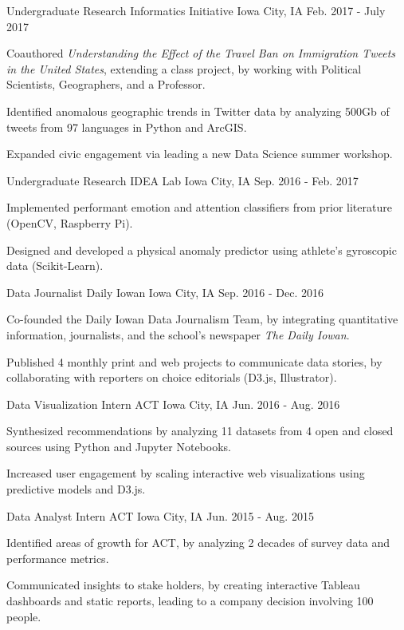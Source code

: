 \begin{cventries}
\cventry
  {Undergraduate Research}
  {Informatics Initiative}
  {Iowa City, IA}
  {Feb. 2017 - July 2017}
  {
    \begin{cvitems}
      \item {Coauthored \textit{Understanding the Effect of the Travel Ban on Immigration Tweets in the United States}, extending a class project, by working with Political Scientists, Geographers, and a Professor.}
      \item {Identified anomalous geographic trends in Twitter data by analyzing 500Gb of tweets from 97 languages in Python and ArcGIS.}
      \item {Expanded civic engagement via leading a new Data Science summer workshop.}
    \end{cvitems}
  }
  \cventry
    {Undergraduate Research}
    {IDEA Lab}
    {Iowa City, IA}
    {Sep. 2016 - Feb. 2017}
    {
      \begin{cvitems}
        \item{Implemented performant emotion and attention classifiers from prior literature (OpenCV, Raspberry Pi).}
        \item {Designed and developed a physical anomaly predictor using athlete's gyroscopic data (Scikit-Learn). }
      \end{cvitems}
    }
  \cventry
    {Data Journalist}
    {Daily Iowan}
    {Iowa City, IA}
    {Sep. 2016 - Dec. 2016}
    {
      \begin{cvitems}
        \item {Co-founded the Daily Iowan Data Journalism Team, by integrating quantitative information, journalists, and the school's newspaper \textit{The Daily Iowan}.}
        \item {Published 4 monthly print and web projects to communicate data stories, by collaborating with reporters on choice editorials (D3.js, Illustrator).}
      \end{cvitems}
    }
  \cventry
    {Data Visualization Intern}
    {ACT}
    {Iowa City, IA}
    {Jun. 2016 - Aug. 2016}
    {
      \begin{cvitems}
        \item {Synthesized recommendations by analyzing 11 datasets from 4 open and closed sources using Python and Jupyter Notebooks. }
        \item {Increased user engagement by scaling interactive web visualizations using predictive models and D3.js.}
      \end{cvitems}
    }
  \cventry
    {Data Analyst Intern}
    {ACT}
    {Iowa City, IA}
    {Jun. 2015 - Aug. 2015}
    {
      \begin{cvitems}
        \item {Identified areas of growth for ACT, by analyzing 2 decades of survey data and performance metrics.}
        \item {Communicated insights to stake holders, by creating interactive Tableau dashboards and static reports, leading to a company decision involving 100 people.}
      \end{cvitems}
    }

\end{cventries}
